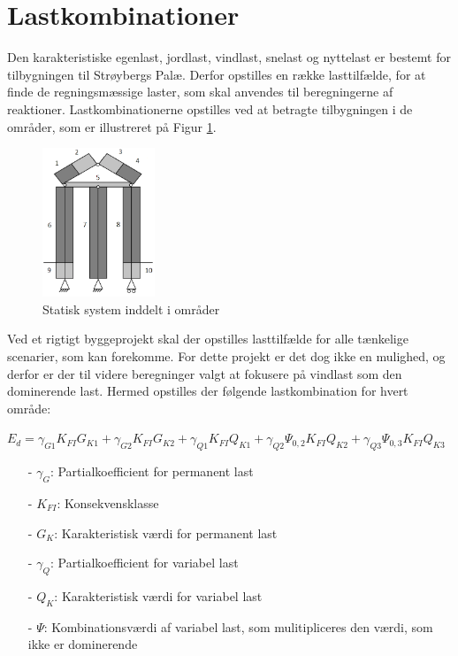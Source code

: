 \section{Lastkombinationer}
Den karakteristiske egenlast, jordlast, vindlast, snelast og nyttelast er bestemt for tilbygningen til Strøybergs Palæ. Derfor opstilles en række lasttilfælde, for at finde de regningsmæssige laster, som skal anvendes til beregningerne af reaktioner. Lastkombinationerne opstilles ved at betragte tilbygningen i de områder, som er illustreret på Figur \ref{fig:omraader}.

\begin{figure}[htbp]
	\centering
	\includegraphics[width=0.3\textwidth]{billeder/indeling.png}
	\caption{Statisk system inddelt i områder}
	\label{fig:omraader}
\end{figure}

Ved et rigtigt byggeprojekt skal der opstilles lasttilfælde for alle tænkelige scenarier, som kan forekomme. For dette projekt er det dog ikke en mulighed, og derfor er der til videre beregninger valgt at fokusere på vindlast som den dominerende last. Hermed opstilles der følgende lastkombination for hvert område:
\begin{center}
	$E_d = \gamma_{G1} K_{FI} G_{K1} + \gamma_{G2} K_{FI} G_{K2} + \gamma_{Q1} K_{FI} Q_{K1} + \gamma_{Q2} \Psi_{0,2} K_{FI} Q_{K2} + \gamma_{Q3} \Psi_{0,3} K_{FI} Q_{K3}$ 
\end{center}

\begin{itemize}
	\item[-] $\gamma_G$: Partialkoefficient for permanent last
	\item[-] $K_{FI}$: Konsekvensklasse
	\item[-] $G_K$: Karakteristisk værdi for permanent last
	\item[-] $\gamma_Q$: Partialkoefficient for variabel last
	\item[-] $Q_K$: Karakteristisk værdi for variabel last
	\item[-] $\Psi$: Kombinationsværdi af variabel last, som mulitipliceres den værdi, som ikke er dominerende 
\end{itemize}

